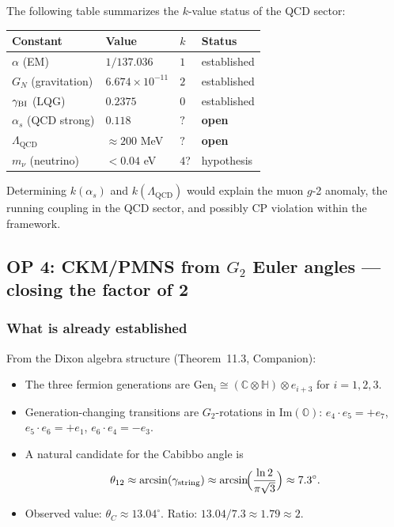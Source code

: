 \begin{remark}
\label{rem:k-qcd}
The following table summarizes the $k$-value status of the QCD sector:
\begin{center}
\renewcommand{\arraystretch}{1.3}
\begin{tabular}{llll}
\toprule
Constant & Value & $k$ & Status \\
\midrule
$\alpha$ (EM)    & $1/137.036$ & $1$ & established \\
$G_N$ (gravitation) & $6.674\times10^{-11}$ & $2$ & established \\
$\gamma_{\mathrm{BI}}$ (LQG)     & $0.2375$    & $0$ & established \\
$\alpha_s$ (QCD strong) & $0.118$ & $?$ & \textbf{open} \\
$\Lambda_{\mathrm{QCD}}$ & $\approx 200$ MeV & $?$ & \textbf{open} \\
$m_\nu$ (neutrino)  & $< 0.04$ eV & $4$? & hypothesis \\
\bottomrule
\end{tabular}
\end{center}
Determining $k(\alpha_s)$ and $k(\Lambda_{\mathrm{QCD}})$ would explain
the muon $g$-2 anomaly, the running coupling in the QCD sector, and
possibly CP violation within the framework.
\end{remark}





\subsection{OP 4: CKM/PMNS from \texorpdfstring{$G_2$}{G2}
  Euler angles — closing the factor of 2}
\label{sec:op4}

\subsubsection{What is already established}

From the Dixon algebra structure (Theorem~11.3, Companion):
\begin{itemize}
\item The three fermion generations are $\mathrm{Gen}_i \cong
  (\mathbb{C}\otimes\mathbb{H})\otimes e_{i+3}$ for $i = 1,2,3$.
\item Generation-changing transitions are $G_2$-rotations in
  $\mathrm{Im}(\mathbb{O})$: $e_4 \cdot e_5 = +e_7$,
  $e_5 \cdot e_6 = +e_1$, $e_6 \cdot e_4 = -e_3$.
\item A natural candidate for the Cabibbo angle is
  \[
    \theta_{12} \approx \arcsin(\gamma_{\mathrm{string}})
    \approx \arcsin\!\Bigl(\frac{\ln 2}{\pi\sqrt{3}}\Bigr)
    \approx 7.3^\circ.
  \]
\item Observed value: $\theta_C \approx 13.04^\circ$.
  Ratio: $13.04/7.3 \approx 1.79 \approx 2$.
\end{itemize}

